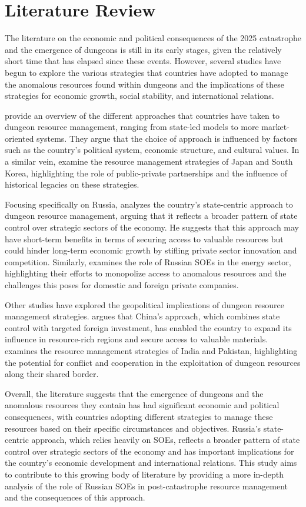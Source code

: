 \documentclass[12pt, a4paper]{article}
\begin{document}
\section{Literature Review}
The literature on the economic and political consequences of the 2025 catastrophe and the emergence of dungeons is still in its early stages, given the relatively short time that has elapsed since these events. However, several studies have begun to explore the various strategies that countries have adopted to manage the anomalous resources found within dungeons and the implications of these strategies for economic growth, social stability, and international relations.

\cite{Chen2026} provide an overview of the different approaches that countries have taken to dungeon resource management, ranging from state-led models to more market-oriented systems. They argue that the choice of approach is influenced by factors such as the country's political system, economic structure, and cultural values. In a similar vein, \cite{Nakamura2027} examine the resource management strategies of Japan and South Korea, highlighting the role of public-private partnerships and the influence of historical legacies on these strategies.

Focusing specifically on Russia, \cite{Popov2026} analyzes the country's state-centric approach to dungeon resource management, arguing that it reflects a broader pattern of state control over strategic sectors of the economy. He suggests that this approach may have short-term benefits in terms of securing access to valuable resources but could hinder long-term economic growth by stifling private sector innovation and competition. Similarly, \cite{Kuznetsova2027} examines the role of Russian SOEs in the energy sector, highlighting their efforts to monopolize access to anomalous resources and the challenges this poses for domestic and foreign private companies.

Other studies have explored the geopolitical implications of dungeon resource management strategies. \cite{Wang2026} argues that China's approach, which combines state control with targeted foreign investment, has enabled the country to expand its influence in resource-rich regions and secure access to valuable materials. \cite{Singh2027} examines the resource management strategies of India and Pakistan, highlighting the potential for conflict and cooperation in the exploitation of dungeon resources along their shared border.

Overall, the literature suggests that the emergence of dungeons and the anomalous resources they contain has had significant economic and political consequences, with countries adopting different strategies to manage these resources based on their specific circumstances and objectives. Russia's state-centric approach, which relies heavily on SOEs, reflects a broader pattern of state control over strategic sectors of the economy and has important implications for the country's economic development and international relations. This study aims to contribute to this growing body of literature by providing a more in-depth analysis of the role of Russian SOEs in post-catastrophe resource management and the consequences of this approach.
\end{document}
